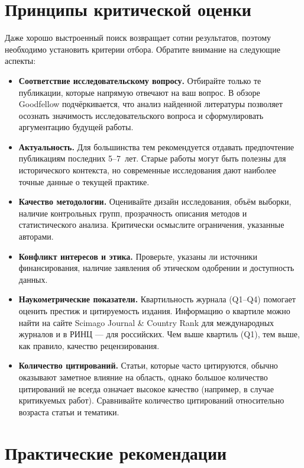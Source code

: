 \documentclass[
  russian,
  12pt,
  a4paper,
]{article}
\begin{document}
\chapter{Принципы критической оценки}\label{sec-evaluation}

Даже хорошо выстроенный поиск возвращает сотни результатов, поэтому
необходимо установить критерии отбора. Обратите внимание на следующие
аспекты:

\begin{itemize}
\item
  \textbf{Соответствие исследовательскому вопросу.} Отбирайте только те
  публикации, которые напрямую отвечают на ваш вопрос. В обзоре
  Goodfellow подчёркивается, что анализ найденной литературы позволяет
  осознать значимость исследовательского вопроса и сформулировать
  аргументацию будущей работы.
\item
  \textbf{Актуальность.} Для большинства тем рекомендуется отдавать
  предпочтение публикациям последних 5--7~лет. Старые работы могут быть
  полезны для исторического контекста, но современные исследования дают
  наиболее точные данные о текущей практике.
\item
  \textbf{Качество методологии.} Оценивайте дизайн исследования, объём
  выборки, наличие контрольных групп, прозрачность описания методов и
  статистического анализа. Критически осмыслите ограничения, указанные
  авторами.
\item
  \textbf{Конфликт интересов и этика.} Проверьте, указаны ли источники
  финансирования, наличие заявления об этическом одобрении и доступность
  данных.
\item
  \textbf{Наукометрические показатели.} Квартильность журнала (Q1--Q4)
  помогает оценить престиж и цитируемость издания. Информацию о квартиле
  можно найти на сайте Scimago Journal \& Country Rank для международных
  журналов и в РИНЦ --- для российских. Чем выше квартиль (Q1), тем
  выше, как правило, качество рецензирования.
\item
  \textbf{Количество цитирований.} Статьи, которые часто цитируются,
  обычно оказывают заметное влияние на область, однако большое
  количество цитирований не всегда означает высокое качество (например,
  в случае критикуемых работ). Сравнивайте количество цитирований
  относительно возраста статьи и тематики.
\end{itemize}

\chapter{Практические
рекомендации}\label{ux43fux440ux430ux43aux442ux438ux447ux435ux441ux43aux438ux435-ux440ux435ux43aux43eux43cux435ux43dux434ux430ux446ux438ux438}
\end{document}

